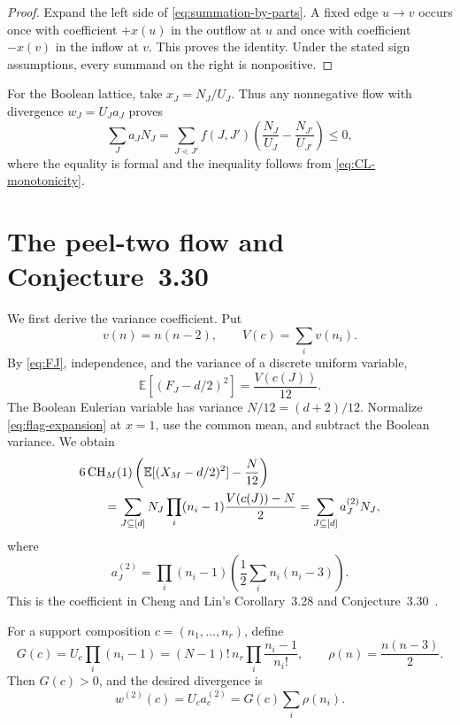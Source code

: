 \documentclass[11pt]{amsart}
\theoremstyle{definition}
\theoremstyle{remark}
\newcommand{\CH}{\operatorname{CH}}
\newcommand{\E}{\mathbb E}
\begin{document}
\begin{proof}
Expand the left side of \eqref{eq:summation-by-parts}.  A fixed edge
$u\to v$ occurs once with coefficient $+x(u)$ in the outflow at $u$
and once with coefficient $-x(v)$ in the inflow at $v$.  This proves the
identity.  Under the stated sign assumptions, every summand on the right is
nonpositive.
\end{proof}

For the Boolean lattice, take $x_J=N_J/U_J$.  Thus any nonnegative flow
with divergence $w_J=U_Ja_J$ proves
\begin{equation}
 \sum_Ja_JN_J
 =\sum_{J\lessdot J'}f(J,J')
 \left(\frac{N_J}{U_J}-\frac{N_{J'}}{U_{J'}}\right)\le0,
 \label{eq:generic-flag-certificate}
\end{equation}
where the equality is formal and the inequality follows from
\eqref{eq:CL-monotonicity}.

\section{The peel-two flow and Conjecture~3.30}
\label{sec:k2}

We first derive the variance coefficient.  Put
\[
 v(n)=n(n-2),\qquad V(c)=\sum_i v(n_i).
\]
By \eqref{eq:FJ}, independence, and the variance of a discrete uniform
variable,
\begin{equation}
 \E\left[(F_J-d/2)^2\right]=\frac{V(c(J))}{12}.
 \label{eq:block-variance}
\end{equation}
The Boolean Eulerian variable has variance $N/12=(d+2)/12$.  Normalize
\eqref{eq:flag-expansion} at $x=1$, use the common mean, and subtract the
Boolean variance.  We obtain
\begin{align}
 &6\CH_M(1)\left(
   \E[(X_M-d/2)^2]-\frac{N}{12}\right)\notag\\
 &\qquad=\sum_{J\subseteq[d]}N_J
 \prod_i(n_i-1)\frac{V(c(J))-N}{2}
 =\sum_{J\subseteq[d]}a_J^{(2)}N_J,
 \label{eq:k2-flag-form}
\end{align}
where
\begin{equation}
 a_J^{(2)}=\prod_i(n_i-1)
 \left(\frac12\sum_i n_i(n_i-3)\right).
 \label{eq:a2}
\end{equation}
This is the coefficient in Cheng and Lin's Corollary~3.28 and
Conjecture~3.30~\cite[p.~22]{ChengLin}.

For a support composition $c=(n_1,\ldots,n_r)$, define
\begin{equation}
 G(c)=U_c\prod_i(n_i-1)
 =(N-1)!\,n_r\prod_i\frac{n_i-1}{n_i!},
 \qquad
 \rho(n)=\frac{n(n-3)}2.
 \label{eq:k2-G-rho}
\end{equation}
Then $G(c)>0$, and the desired divergence is
\begin{equation}
 w^{(2)}(c)=U_ca_c^{(2)}=G(c)\sum_i\rho(n_i).
 \label{eq:k2-target}
\end{equation}
\end{document}
